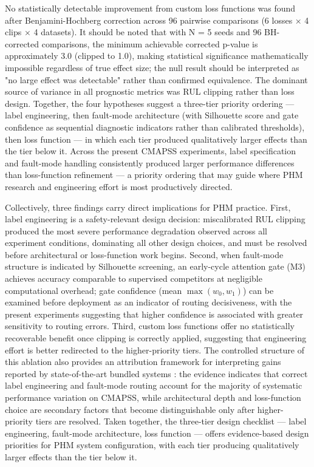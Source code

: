 \documentclass[review,12pt]{elsarticle}
\begin{document}
No statistically detectable improvement from custom loss functions was found after Benjamini-Hochberg correction across 96 pairwise comparisons (6 losses × 4 clips × 4 datasets). It should be noted that with N = 5 seeds and 96 BH-corrected comparisons, the minimum achievable corrected p-value is approximately 3.0 (clipped to 1.0), making statistical significance mathematically impossible regardless of true effect size; the null result should be interpreted as "no large effect was detectable" rather than confirmed equivalence. The dominant source of variance in all prognostic metrics was RUL clipping rather than loss design. Together, the four hypotheses suggest a three-tier priority ordering — label engineering, then fault-mode architecture (with Silhouette score and gate confidence as sequential diagnostic indicators rather than calibrated thresholds), then loss function — in which each tier produced qualitatively larger effects than the tier below it. Across the present CMAPSS experiments, label specification and fault-mode handling consistently produced larger performance differences than loss-function refinement --- a priority ordering that may guide where PHM research and engineering effort is most productively directed.

Collectively, three findings carry direct implications for PHM practice. First, label engineering is a safety-relevant design decision: miscalibrated RUL clipping produced the most severe performance degradation observed across all experiment conditions, dominating all other design choices, and must be resolved before architectural or loss-function work begins. Second, when fault-mode structure is indicated by Silhouette screening, an early-cycle attention gate (M3) achieves accuracy comparable to supervised competitors at negligible computational overhead; gate confidence (mean $\max(w_0, w_1)$) can be examined before deployment as an indicator of routing decisiveness, with the present experiments suggesting that higher confidence is associated with greater sensitivity to routing errors. Third, custom loss functions offer no statistically recoverable benefit once clipping is correctly applied, suggesting that engineering effort is better redirected to the higher-priority tiers. The controlled structure of this ablation also provides an attribution framework for interpreting gains reported by state-of-the-art bundled systems \cite{ref14,ref29,ref42}: the evidence indicates that correct label engineering and fault-mode routing account for the majority of systematic performance variation on CMAPSS, while architectural depth and loss-function choice are secondary factors that become distinguishable only after higher-priority tiers are resolved. Taken together, the three-tier design checklist — label engineering, fault-mode architecture, loss function — offers evidence-based design priorities for PHM system configuration, with each tier producing qualitatively larger effects than the tier below it.
\end{document}
